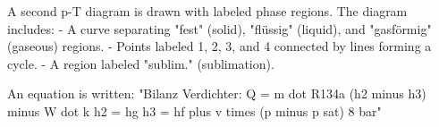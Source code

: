 A second p-T diagram is drawn with labeled phase regions. The diagram includes:  
- A curve separating "fest" (solid), "flüssig" (liquid), and "gasförmig" (gaseous) regions.  
- Points labeled 1, 2, 3, and 4 connected by lines forming a cycle.  
- A region labeled "sublim." (sublimation).  

An equation is written:  
"Bilanz Verdichter:  
Q = m dot R134a (h2 minus h3) minus W dot k  
h2 = hg  
h3 = hf plus v times (p minus p sat)  
8 bar"